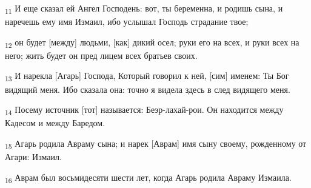 \begin{tcolorbox}
\textsubscript{11} И еще сказал ей Ангел Господень: вот, ты беременна, и родишь сына, и наречешь ему имя Измаил, ибо услышал Господь страдание твое;
\end{tcolorbox}
\begin{tcolorbox}
\textsubscript{12} он будет [между] людьми, [как] дикий осел; руки его на всех, и руки всех на него; жить будет он пред лицем всех братьев своих.
\end{tcolorbox}
\begin{tcolorbox}
\textsubscript{13} И нарекла [Агарь] Господа, Который говорил к ней, [сим] именем: Ты Бог видящий меня. Ибо сказала она: точно я видела здесь в след видящего меня.
\end{tcolorbox}
\begin{tcolorbox}
\textsubscript{14} Посему источник [тот] называется: Беэр-лахай-рои. Он находится между Кадесом и между Баредом.
\end{tcolorbox}
\begin{tcolorbox}
\textsubscript{15} Агарь родила Авраму сына; и нарек [Аврам] имя сыну своему, рожденному от Агари: Измаил.
\end{tcolorbox}
\begin{tcolorbox}
\textsubscript{16} Аврам был восьмидесяти шести лет, когда Агарь родила Авраму Измаила.
\end{tcolorbox}
